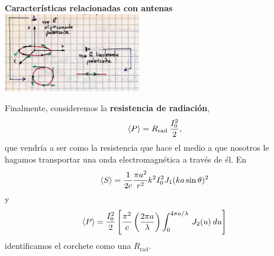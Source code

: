 \documentclass[10pt,oneside]{CBFT_book}
\begin{document}
\begin{notas}{\bf Características relacionadas con antenas}
\includegraphics[width=0.45\textwidth]{images/fig_ft1_polarizacion_antena.jpg}

Finalmente, consideremos la {\bf resistencia de radiación},
\[
	\:\left\langle P \right\rangle = R_\text{rad} \: \frac{I_0^2}{2},
\]
que vendría a ser como la resistencia que hace el medio a que nosotros le hagamos transportar
una onda electromagnética a través de él.
En
\[
	\:\left\langle S \right\rangle = \frac{1}{2c} \frac{\pi a^2}{r^2} k^2 I_0^2 J_1(ka\sin\theta)^2
\]
y
\[
	\:\left\langle P \right\rangle = \frac{I_0^2}{2} \left[ \frac{\pi^2}{c} \left( \frac{ 2\pi a }{ \lambda } \right) 
	\int_0^{4\pi a/\lambda} \: J_2(u)\: du \right]
\]
identificamos el corchete como una $R_\text{rad}$.
 
\end{notas}
\end{document}
